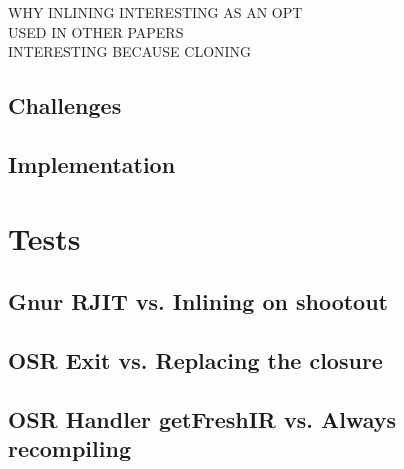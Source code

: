 WHY INLINING INTERESTING AS AN OPT\\

USED IN OTHER PAPERS\\

INTERESTING BECAUSE CLONING\\

\subsection{Challenges}
\subsection{Implementation}
\section{Tests}
\subsection{Gnur RJIT vs. Inlining on shootout}
\subsection{OSR Exit vs. Replacing the closure}
\subsection{OSR Handler getFreshIR vs. Always recompiling}


